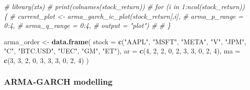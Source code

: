 \documentclass[
]{article}
\newenvironment{Shaded}{\begin{snugshade}}{\end{snugshade}}
\newcommand{\AttributeTok}[1]{\textcolor[rgb]{0.13,0.29,0.53}{#1}}
\newcommand{\CommentTok}[1]{\textcolor[rgb]{0.56,0.35,0.01}{\textit{#1}}}
\newcommand{\DecValTok}[1]{\textcolor[rgb]{0.00,0.00,0.81}{#1}}
\newcommand{\FunctionTok}[1]{\textcolor[rgb]{0.13,0.29,0.53}{\textbf{#1}}}
\newcommand{\NormalTok}[1]{#1}
\newcommand{\OtherTok}[1]{\textcolor[rgb]{0.56,0.35,0.01}{#1}}
\newcommand{\StringTok}[1]{\textcolor[rgb]{0.31,0.60,0.02}{#1}}
\begin{document}
\begin{Shaded}
\begin{Highlighting}[]
\CommentTok{\# library(xts)}
\CommentTok{\# print(colnames(stock\_return))}
\CommentTok{\# for (i in 1:ncol(stock\_return)) \{}
\CommentTok{\#   current\_plot \textless{}{-} arma\_garch\_ic\_plot(stock\_return[,i], }
\CommentTok{\#                                    arma\_p\_range = 0:4, }
\CommentTok{\#                                    arma\_q\_range = 0:4,}
\CommentTok{\#                                    output = "plot")}
\CommentTok{\# }
\CommentTok{\# \}}
\end{Highlighting}
\end{Shaded}

\begin{Shaded}
\begin{Highlighting}[]
\NormalTok{arma\_order }\OtherTok{\textless{}{-}} \FunctionTok{data.frame}\NormalTok{(}
  \AttributeTok{stock =} \FunctionTok{c}\NormalTok{(}\StringTok{"AAPL"}\NormalTok{, }\StringTok{"MSFT"}\NormalTok{, }\StringTok{"META"}\NormalTok{, }\StringTok{"V"}\NormalTok{, }\StringTok{"JPM"}\NormalTok{, }\StringTok{"C"}\NormalTok{, }\StringTok{"BTC.USD"}\NormalTok{, }\StringTok{"UEC"}\NormalTok{, }\StringTok{"GM"}\NormalTok{, }\StringTok{"ET"}\NormalTok{),}
  \AttributeTok{ar =} \FunctionTok{c}\NormalTok{(}\DecValTok{4}\NormalTok{, }\DecValTok{2}\NormalTok{, }\DecValTok{2}\NormalTok{, }\DecValTok{0}\NormalTok{, }\DecValTok{2}\NormalTok{, }\DecValTok{3}\NormalTok{, }\DecValTok{3}\NormalTok{, }\DecValTok{0}\NormalTok{, }\DecValTok{2}\NormalTok{, }\DecValTok{4}\NormalTok{),}
  \AttributeTok{ma =} \FunctionTok{c}\NormalTok{(}\DecValTok{3}\NormalTok{, }\DecValTok{3}\NormalTok{, }\DecValTok{2}\NormalTok{, }\DecValTok{0}\NormalTok{, }\DecValTok{3}\NormalTok{, }\DecValTok{3}\NormalTok{, }\DecValTok{3}\NormalTok{, }\DecValTok{0}\NormalTok{, }\DecValTok{2}\NormalTok{, }\DecValTok{4}\NormalTok{)}
\NormalTok{)}
\end{Highlighting}
\end{Shaded}

\subsubsection{ARMA-GARCH modelling}\label{arma-garch-modelling-1}
\end{document}
